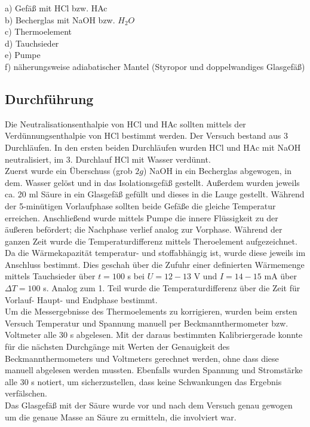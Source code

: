 \documentclass[12pt,a4paper,titlepage,headinclude,bibtotoc]{scrartcl}
\begin{document}
a) Gefäß mit HCl bzw. HAc\\
b) Becherglas mit NaOH bzw. $H_2O$\\
c) Thermoelement\\
d) Tauchsieder\\
e) Pumpe \\
f) näherungsweise adiabatischer Mantel (Styropor und doppelwandiges Glasgefäß)\\


\subsection{Durchführung}
Die Neutralisationsenthalpie von HCl und HAc sollten mittels der Verdünnungsenthalpie von HCl bestimmt werden. Der Versuch bestand aus 3 Durchläufen. In den ersten beiden Durchläufen wurden HCl und HAc mit NaOH neutralisiert, im 3. Durchlauf HCl mit Wasser verdünnt.\\
Zuerst wurde ein Überschuss (grob $2g$) NaOH in ein Becherglas abgewogen, in dem. Wasser gelöst und in das Isolationsgefäß gestellt. Außerdem wurden jeweils ca. 20 ml Säure in ein Glasgefäß gefüllt und dieses in die Lauge gestellt.
Während der 5-minütigen Vorlaufphase sollten beide Gefäße die gleiche Temperatur erreichen. Anschließend wurde mittels Pumpe die innere Flüssigkeit zu der äußeren befördert; die Nachphase verlief analog zur Vorphase. Während der ganzen Zeit wurde die Temperaturdifferenz mittels Theroelement aufgezeichnet. \\
Da die Wärmekapazität temperatur- und stoffabhängig ist, wurde diese jeweils im Anschluss bestimmt. Dies geschah über die Zufuhr einer definierten Wärmemenge mittels Tauchsieder über $t=100$ s bei $U= 12-13$ V und $I=14-15$ mA über $\Delta T=100$ s. Analog zum 1. Teil wurde die Temperaturdifferenz über die Zeit für Vorlauf- Haupt- und Endphase bestimmt. \\
Um die Messergebnisse des Thermoelements zu korrigieren, wurden beim ersten Versuch Temperatur und Spannung manuell per Beckmannthermometer bzw. Voltmeter alle 30 s abgelesen. Mit der daraus bestimmten Kalibriergerade konnte für die nächsten Durchgänge mit Werten der Genauigkeit des Beckmannthermometers und Voltmeters gerechnet werden, ohne dass diese manuell abgelesen werden mussten.  Ebenfalls wurden Spannung und Stromstärke alle 30 s notiert, um sicherzustellen, dass keine Schwankungen das Ergebnis verfälschen.\\
Das Glasgefäß mit der Säure wurde vor und nach dem Versuch genau gewogen um die genaue Masse an Säure zu ermitteln, die involviert war.\\
\end{document}
